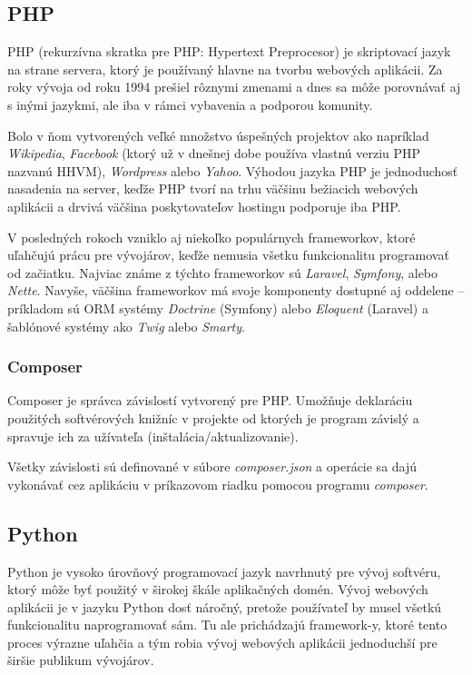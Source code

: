 \subsection*{PHP}

PHP (rekurzívna skratka pre PHP: Hypertext Preprocesor) je skriptovací jazyk na strane servera, ktorý je používaný hlavne na tvorbu webových aplikácii. Za roky vývoja od roku 1994 prešiel rôznymi zmenami a dnes sa môže porovnávať aj s inými jazykmi, ale iba v rámci vybavenia a podporou komunity.

Bolo v ňom vytvorených veľké množstvo úspešných projektov ako napríklad \emph{Wikipedia}, \emph{Facebook} (ktorý už v dnešnej dobe používa vlastnú verziu PHP nazvanú HHVM), \emph{Wordpress} alebo \emph{Yahoo}. Výhodou jazyka PHP je jednoduchosť nasadenia na server, keďže PHP tvorí na trhu väčšinu bežiacich webových aplikácii a drvivá väčšina poskytovateľov hostingu podporuje iba PHP.

V posledných rokoch vzniklo aj niekoľko populárnych frameworkov, ktoré uľahčujú prácu pre vývojárov, keďže nemusia všetku funkcionalitu programovať od začiatku. Najviac známe z týchto frameworkov sú \emph{Laravel}, \emph{Symfony}, alebo \emph{Nette}. Navyše, väčšina frameworkov má svoje komponenty dostupné aj oddelene -- príkladom sú ORM systémy \emph{Doctrine} (Symfony) alebo \emph{Eloquent} (Laravel) a šablónové systémy ako \emph{Twig} alebo \emph{Smarty}.

\subsubsection*{Composer}

Composer je správca závislostí vytvorený pre PHP. Umožňuje deklaráciu použitých softvérových knižníc v projekte od ktorých je program závislý a spravuje ich za užívateľa (inštalácia/aktualizovanie). 

Všetky závislosti sú definované v súbore \emph{composer.json} a operácie sa dajú vykonávať cez aplikáciu v príkazovom riadku pomocou programu \emph{composer}.

\subsection*{Python}

Python je vysoko úrovňový programovací jazyk navrhnutý pre vývoj softvéru, ktorý môže byť použitý v širokej škále aplikačných domén. Vývoj webových aplikácii je v jazyku Python dosť náročný, pretože používateľ by musel všetkú funkcionalitu naprogramovať sám. Tu ale prichádzajú framework-y, ktoré tento proces výrazne uľahčia a tým robia vývoj webových aplikácii jednoduchší pre širšie publikum vývojárov.

